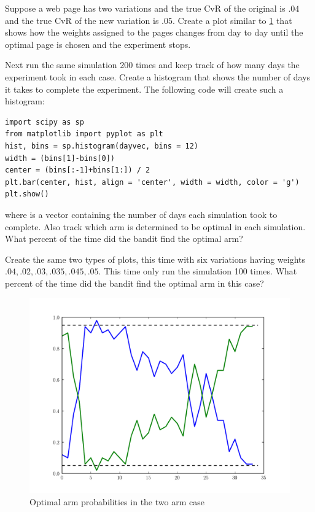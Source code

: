 \begin{problem}
Suppose a web page has two variations and the true CvR of the original is $.04$ and the true CvR of the new variation is $.05$.  Create a plot similar to \ref{fig:weights1} that shows how the weights assigned to the pages changes from day to day until the optimal page is chosen and the experiment stops.

Next run the same simulation 200 times and keep track of how many days the experiment took in each case.  Create a histogram that shows the number of days it takes to complete the experiment.  The following code will create such a histogram:

\begin{lstlisting}
import scipy as sp
from matplotlib import pyplot as plt
hist, bins = sp.histogram(dayvec, bins = 12)
width = (bins[1]-bins[0])
center = (bins[:-1]+bins[1:]) / 2
plt.bar(center, hist, align = 'center', width = width, color = 'g')
plt.show()
\end{lstlisting}
where  is a vector containing the number of days each simulation took to complete.  Also track which arm is determined to be optimal in each simulation.  What percent of the time did the bandit find the optimal arm?

Create the same two types of plots, this time with six variations having weights $.04,.02,.03,.035,.045,.05$.  This time only run the simulation 100 times.  What percent of the time did the bandit find the optimal arm in this case?
\end{problem}

\begin{figure}
\begin{center}
        \includegraphics[width=\textwidth]{./Applications/MarkDecProc/weights1.pdf}
        \caption{Optimal arm probabilities in the two arm case}
				\label{fig:weights1}
\end{center}
\end{figure}

